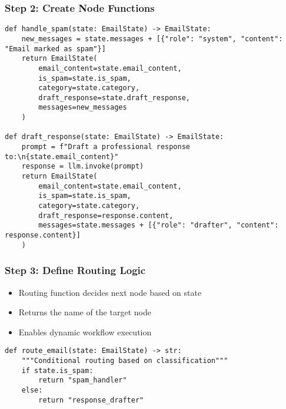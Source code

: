\begin{frame}[fragile]\frametitle{Step 2: Create Node Functions}
      \begin{lstlisting}
def handle_spam(state: EmailState) -> EmailState:
    new_messages = state.messages + [{"role": "system", "content": "Email marked as spam"}]
    return EmailState(
        email_content=state.email_content,
        is_spam=state.is_spam,
        category=state.category,
        draft_response=state.draft_response,
        messages=new_messages
    )

def draft_response(state: EmailState) -> EmailState:
    prompt = f"Draft a professional response to:\n{state.email_content}"
    response = llm.invoke(prompt)
    return EmailState(
        email_content=state.email_content,
        is_spam=state.is_spam,
        category=state.category,
        draft_response=response.content,
        messages=state.messages + [{"role": "drafter", "content": response.content}]
    )
      \end{lstlisting}
\end{frame}

\begin{frame}[fragile]\frametitle{Step 3: Define Routing Logic}

      \begin{itemize}
        \item Routing function decides next node based on state
        \item Returns the name of the target node
        \item Enables dynamic workflow execution
      \end{itemize}
	  
      \begin{lstlisting}
def route_email(state: EmailState) -> str:
    """Conditional routing based on classification"""
    if state.is_spam:
        return "spam_handler"
    else:
        return "response_drafter"
      \end{lstlisting}
      

\end{frame}

